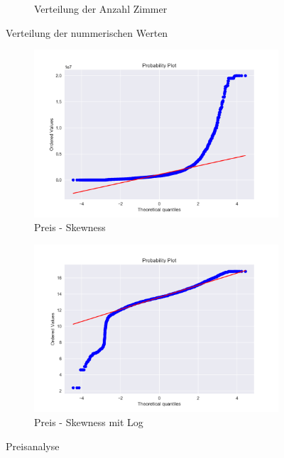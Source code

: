 \begin{figure}[h]
\begin{subfigure}{.5\textwidth}
  \caption{Verteilung der Anzahl Zimmer}
\end{subfigure}
\caption{Verteilung der nummerischen Werten}
\end{figure}

\begin{figure}[H]
\begin{subfigure}{.5\textwidth}
  \centering
  \includegraphics[width=\linewidth]{images/anhang/analysis/skewness.png}
  \caption{Preis - Skewness}
\end{subfigure}
\begin{subfigure}{.5\textwidth}
  \centering
  \includegraphics[width=\linewidth]{images/anhang/analysis/log_skewness.png}
  \caption{Preis - Skewness mit Log}
\end{subfigure}
\caption{Preisanalyse}
\end{figure}

